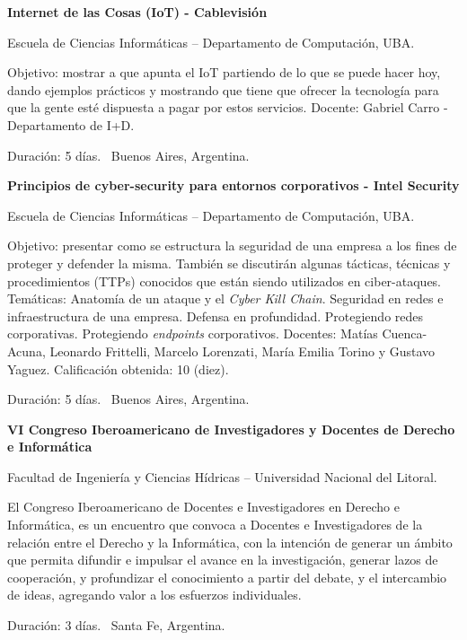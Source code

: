 \documentclass[letterpaper,MMMyyyy,nonstop]{simpleresumecv}
\begin{document}
\begin{body}
\Gap
\textbf{Internet de las Cosas (IoT) - Cablevisión}
\hfill
{}

\BulletItem Escuela de Ciencias Informáticas – Departamento de Computación, UBA.
\begin{detail}
	\SubBulletItem
	Objetivo: mostrar a que apunta el IoT partiendo de lo que se puede hacer hoy, dando ejemplos prácticos y  mostrando que tiene que ofrecer la tecnología para que la gente	esté dispuesta a pagar por estos servicios.	
	\SubBulletItem
	Docente: Gabriel Carro - Departamento de I+D.
\end{detail}
Duración: 5 días. \SubBulletSymbol\, Buenos Aires, Argentina.

\Gap
\textbf{Principios de cyber-security para entornos corporativos - Intel Security}
\hfill
{}

\BulletItem Escuela de Ciencias Informáticas – Departamento de Computación, UBA.
\begin{detail}
	\SubBulletItem
	Objetivo: presentar como se estructura la seguridad de una empresa a los fines de proteger y defender la  misma. También se discutirán algunas tácticas, técnicas y procedimientos (TTPs) conocidos que están siendo utilizados en ciber-ataques.
	\SubBulletItem
	Temáticas: Anatomía de un ataque y el \textit{Cyber Kill Chain}. Seguridad en redes e infraestructura de una empresa. Defensa en profundidad. Protegiendo redes corporativas. Protegiendo \textit{endpoints} corporativos.
	\SubBulletItem
	Docentes: Matías Cuenca-Acuna, Leonardo Frittelli, Marcelo Lorenzati,  María  Emilia  Torino  y Gustavo Yaguez.
	\SubBulletItem
	Calificación obtenida: 10 (diez).
\end{detail}
Duración: 5 días. \SubBulletSymbol\, Buenos Aires, Argentina.

\Gap
\textbf{VI Congreso Iberoamericano de Investigadores y Docentes de Derecho e Informática}
\hfill
{}

\BulletItem Facultad de Ingeniería y Ciencias Hídricas – Universidad Nacional del Litoral.
\begin{detail}
	\SubBulletItem
	El Congreso Iberoamericano de Docentes e Investigadores en Derecho e Informática, es un encuentro que convoca a Docentes e Investigadores de la relación entre el Derecho y la Informática, con la intención de generar un ámbito que permita difundir e impulsar el avance en la investigación, generar lazos de cooperación, y profundizar el conocimiento a partir del debate, y el intercambio de ideas, agregando valor a los esfuerzos individuales.
\end{detail}
Duración: 3 días. \SubBulletSymbol\, Santa Fe, Argentina.


\end{body}
\end{document}
